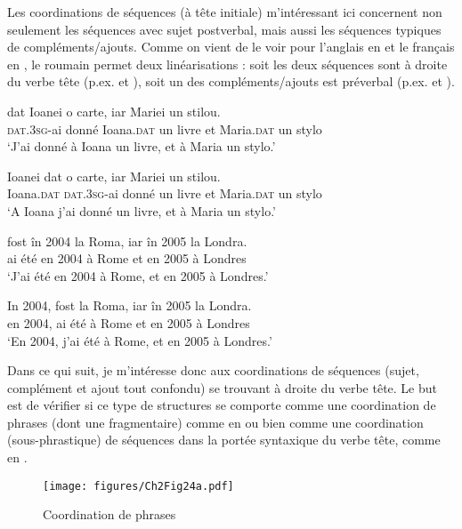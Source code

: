 Les coordinations de séquences (à tête initiale) m’intéressant ici concernent non seulement les séquences avec sujet postverbal, mais aussi les séquences typiques de compléments/ajouts. Comme on vient de le voir pour l’anglais en  et le français en , le roumain permet deux linéarisations : soit les deux séquences sont à droite du verbe tête (p.ex.  et ), soit un des compléments/ajouts est préverbal (p.ex.  et ).  

\ea \label{ch2:ex285}
\ea 
\gll {}  dat  Ioanei  o  carte,  iar  Mariei  un  stilou. \label{ch2:ex285a}\\
\textsc{dat.3sg}{}-ai  donné  Ioana.\textsc{dat} un  livre  et Maria.\textsc{dat}  un  stylo\\
\glt ‘J’ai donné à Ioana un livre, et à Maria un stylo.’

\ex 
\gll Ioanei    dat  o  carte,  iar  Mariei  un  stilou. \label{ch2:ex285b}\\
Ioana.\textsc{dat} \textsc{dat.3sg}{}-ai  donné  un  livre  et  Maria.\textsc{dat}  un  stylo\\
\glt ‘A Ioana j’ai donné un livre, et à Maria un stylo.’
\z
\z


\ea \label{ch2:ex286}
\ea 
\gll {} fost  în  2004  la  Roma,  iar  în  2005  la  Londra. \label{ch2:ex286a}\\
ai  été  en  2004  à  Rome  et  en  2005  à  Londres\\
\glt ‘J’ai été en 2004 à Rome, et en 2005 à Londres.’

\ex 
\gll In 2004,  fost  la  Roma,  iar  în  2005  la  Londra. \label{ch2:ex286b}\\
en  2004,  ai  été  à  Rome  et  en  2005  à  Londres\\
\glt ‘En 2004, j’ai été à Rome, et en 2005 à Londres.’ 
\z
\z

Dans ce qui suit, je m’intéresse donc aux coordinations de séquences (sujet, complément et ajout tout confondu) se trouvant à droite du verbe tête. Le but est de vérifier si ce type de structures se comporte comme une coordination de phrases (dont une fragmentaire) comme en  ou bien comme une coordination (sous-phrastique) de séquences dans la portée syntaxique du verbe tête, comme en . 

\begin{figure} 

\texttt{[image: figures/Ch2Fig24a.pdf]}%

\caption{Coordination de phrases}
\label{ch2:fig24a}
\end{figure}


